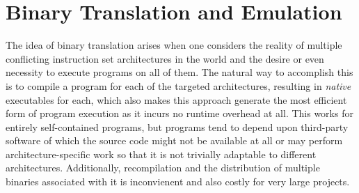%
%

\section{Binary Translation and Emulation}

The idea of binary translation arises when one considers the reality of multiple conflicting instruction set
architectures in the world and the desire or even necessity to execute programs on all of them. The natural way to
accomplish this is to compile a program for each of the targeted architectures, resulting in \textit{native} executables
for each, which also makes this approach generate the most efficient form of program execution as it incurs no runtime
overhead at all. This works for entirely self-contained programs, but programs tend to depend upon third-party software
of which the source code might not be available at all or may perform architecture-specific work so that it is not
trivially adaptable to different architectures. Additionally, recompilation and the distribution of multiple binaries
associated with it is inconvienent and also costly for very large projects.

